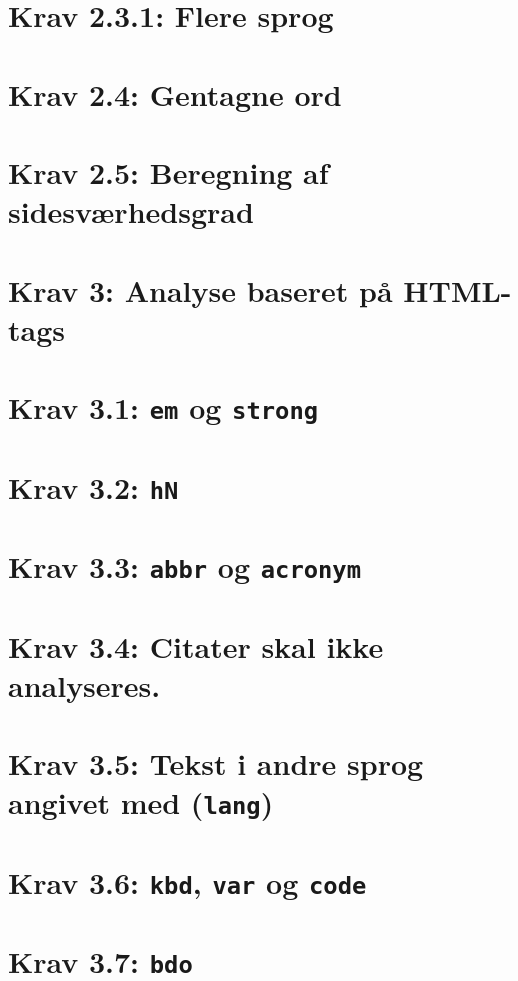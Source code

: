 \documentclass[a4paper,oneside,article, titlepage]{memoir}
\begin{document}
\section*{Krav 2.3.1: Flere sprog}

\section*{Krav 2.4: Gentagne ord}

\section*{Krav 2.5: Beregning af sidesværhedsgrad}

\section*{Krav 3: Analyse baseret på HTML-tags}

\section*{Krav 3.1: \texttt{em} og \texttt{strong}}

\section*{Krav 3.2: \texttt{hN}}

\section*{Krav 3.3: \texttt{abbr} og \texttt{acronym}}

\section*{Krav 3.4: Citater skal ikke analyseres.}

\section*{Krav 3.5: Tekst i andre sprog angivet med
  (\texttt{lang})}

\section*{Krav 3.6: \texttt{kbd}, \texttt{var} og \texttt{code}}

\section*{Krav 3.7: \texttt{bdo}}
\end{document}
